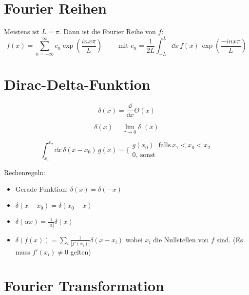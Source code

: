 \section{Fourier Reihen}

\begin{framedprop}
	Meistens ist $L = \pi$. Dann ist die Fourier Reihe von $f$:
	\[
	f(x) = \sum_{n=-\infty}^{\infty} c_n \exp\left(\frac{inx \pi}{L}\right) \qquad \textrm{ mit }
	c_n = \frac{1}{2L} \int_{-L}^{L} \dd x \, f(x) \, \exp\left(\frac{-inx \pi}{L}\right)
	\]
\end{framedprop}

\section{Dirac-Delta-Funktion}

\begin{frameddefn}
	\[\delta(x) = \frac{\dd}{\dd x}\Theta(x)\]
\end{frameddefn}

\begin{frameddefn}
	\[
	\delta(x) = \lim\limits_{\tau \to 0} \delta_{\tau}(x)
	\]
\end{frameddefn}

\begin{frameddefn}
	\[
	\int_{x_1}^{x_2} \dd x\, \delta(x-x_0)\, g(x) = \biggl\{\begin{array}{ll}
		g(x_0) \ \ \ \textrm{falls}\  x_1 < x_0 < x_2 \\
		0, \  \textrm{sonst}
	\end{array}
	\]
\end{frameddefn}

Rechenregeln:
\begin{itemize}
	\item Gerade Funktion: $\delta(x) = \delta(-x)$
	\item $\delta(x-x_0) = \delta(x_0 - x)$
	\item $\delta(\alpha x) = \frac{1}{|\alpha|} \delta(x)$
	\item $\delta(f(x)) = \sum_{i} \frac{1}{|f'(x_i)|} \delta(x-x_i)$ wobei $x_i$ die Nullstellen von $f$ sind. (Es muss $f'(x_i) \neq 0$ gelten)
\end{itemize}

\section{Fourier Transformation}


